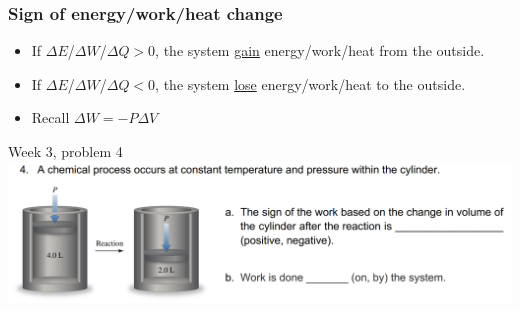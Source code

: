 \documentclass[aspectratio=169,xcolor={dvipsnames}]{beamer}
\begin{document}
\begin{frame}[t]
    \frametitle{Sign of energy/work/heat change}
    \begin{itemize}
        \item If $\Delta E$/$\Delta W$/$\Delta Q > 0$, the system \ul{gain}
            energy/work/heat from the outside.
        \item If $\Delta E$/$\Delta W$/$\Delta Q < 0$, the system \ul{lose}
            energy/work/heat to the outside.
        \item Recall $\Delta W = -P\Delta V$
    \end{itemize}
    Week 3, problem 4
    \includegraphics[width=\textwidth]{q4.png}
\end{frame}
\end{document}
